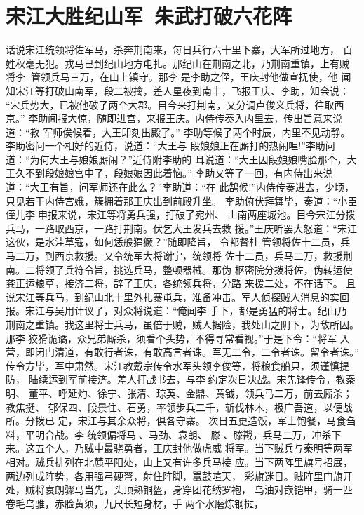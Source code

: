 \chapter{宋江大胜纪山军~朱武打破六花阵}

话说宋江统领将佐军马，杀奔荆南来，每日兵行六十里下寨，大军所过地方，
百姓秋毫无犯。戎马已到纪山地方屯扎。那纪山在荆南之北，乃荆南重镇，上有贼
将李，管领兵马三万，在山上镇守。那李是李助之侄，王庆封他做宣抚使，他
闻知宋江等打破山南军，段二被擒，差人星夜到南丰，飞报王庆、李助，知会说：
“宋兵势大，已被他破了两个大郡。目今来打荆南，又分调卢俊义兵将，往取西京。”
李助闻报大惊，随即进宫，来报王庆。内侍传奏入内里去，传出旨意来说道：“教
军师俟候着，大王即刻出殿了。”
李助等候了两个时辰，内里不见动静。李助密问一个相好的近侍，说道：“大王与
段娘娘正在厮打的热闹哩!”李助问道：“为何大王与娘娘厮闹？”近侍附李助的
耳说道：“大王因段娘娘嘴脸那个，大王久不到段娘娘宫中了，段娘娘因此着恼。”
李助又等了一回，有内侍出来说道：“大王有旨，问军师还在此么？”李助道：“在
此鹄候!”内侍传奏进去，少顷，只见若干内侍宫娥，簇拥着那王庆出到前殿升坐。
李助俯伏拜舞毕，奏道：“小臣侄儿李申报来说，宋江等将勇兵强，打破了宛州、
山南两座城池。目今宋江分拨兵马，一路取西京，一路打荆南。伏乞大王发兵去救
援。”王庆听罢大怒道：“宋江这伙，是水洼草寇，如何恁般猖獗？”随即降旨，
令都督杜管领将佐十二员，兵马二万，到西京救援。又令统军大将谢宇，统领将
佐十二员，兵马二万，救援荆南。二将领了兵符令旨，挑选兵马，整顿器械。那伪
枢密院分拨将佐，伪转运使龚正运粮草，接济二将，辞了王庆，各统领兵将，分路
来援二处，不在话下。
且说宋江等兵马，到纪山北十里外扎寨屯兵，准备冲击。军人侦探贼人消息的实回
报。宋江与吴用计议了，对众将说道：“俺闻李手下，都是勇猛的将士。纪山乃
荆南之重镇。我这里将士兵马，虽倍于贼，贼人据险，我处山之阴下，为敌所囚。
那李狡猾诡谲，众兄弟厮杀，须看个头势，不得寻常看视。”于是下令：“将军
入营，即闭门清道，有敢行者诛，有敢高言者诛。军无二令，二令者诛。留令者诛。”
传令方毕，军中肃然。宋江教戴宗传令水军头领李俊等，将粮食船只，须谨慎提防，
陆续运到军前接济。差人打战书去，与李约定次日决战。宋先锋传令，教秦明、
董平、呼延灼、徐宁、张清、琼英、金鼎、黄钺，领兵马二万，前去厮杀；教焦挺、
郁保四、段景住、石勇，率领步兵二千，斩伐林木，极广吾道，以便战所。分拨已
定，宋江与其余众将，俱各守寨。
次日五更造饭，军士饱餐，马食刍料，平明合战。李统领偏将马、马劲、袁朗、
滕、滕戡，兵马二万，冲杀下来。这五个人，乃贼中最骁勇者，王庆封他做虎威
将军。当下贼兵与秦明等两军相对。贼兵排列在北麓平阳处，山上又有许多兵马接
应。当下两阵里旗号招展，两边列成阵势，各用强弓硬弩，射住阵脚，鼍鼓喧天，
彩旗迷日。贼阵里门旗开处，贼将袁朗骤马当先，头顶熟铜盔，身穿团花绣罗袍，
乌油对嵌铠甲，骑一匹卷毛乌骓，赤脸黄须，九尺长短身材，手两个水磨炼钢挝，
